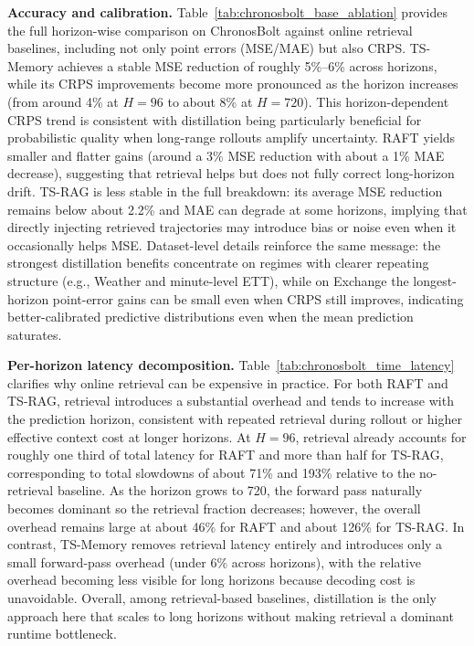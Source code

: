 \noindent\textbf{Accuracy and calibration.}
Table~\ref{tab:chronosbolt_base_ablation} provides the full horizon-wise comparison on ChronosBolt against online retrieval baselines, including not only point errors (MSE/MAE) but also CRPS. TS-Memory achieves a stable MSE reduction of roughly 5\%--6\% across horizons, while its CRPS improvements become more pronounced as the horizon increases (from around 4\% at $H=96$ to about 8\% at $H=720$). This horizon-dependent CRPS trend is consistent with distillation being particularly beneficial for probabilistic quality when long-range rollouts amplify uncertainty. RAFT yields smaller and flatter gains (around a 3\% MSE reduction with about a 1\% MAE decrease), suggesting that retrieval helps but does not fully correct long-horizon drift. TS-RAG is less stable in the full breakdown: its average MSE reduction remains below about 2.2\% and MAE can degrade at some horizons, implying that directly injecting retrieved trajectories may introduce bias or noise even when it occasionally helps MSE. Dataset-level details reinforce the same message: the strongest distillation benefits concentrate on regimes with clearer repeating structure (e.g., Weather and minute-level ETT), while on Exchange the longest-horizon point-error gains can be small even when CRPS still improves, indicating better-calibrated predictive distributions even when the mean prediction saturates.


\noindent\textbf{Per-horizon latency decomposition.}
Table~\ref{tab:chronosbolt_time_latency} clarifies why online retrieval can be expensive in practice. For both RAFT and TS-RAG, retrieval introduces a substantial overhead and tends to increase with the prediction horizon, consistent with repeated retrieval during rollout or higher effective context cost at longer horizons. At $H=96$, retrieval already accounts for roughly one third of total latency for RAFT and more than half for TS-RAG, corresponding to total slowdowns of about 71\% and 193\% relative to the no-retrieval baseline. As the horizon grows to 720, the forward pass naturally becomes dominant so the retrieval fraction decreases; however, the overall overhead remains large at about 46\% for RAFT and about 126\% for TS-RAG. In contrast, TS-Memory removes retrieval latency entirely and introduces only a small forward-pass overhead (under 6\% across horizons), with the relative overhead becoming less visible for long horizons because decoding cost is unavoidable. Overall, among retrieval-based baselines, distillation is the only approach here that scales to long horizons without making retrieval a dominant runtime bottleneck.

